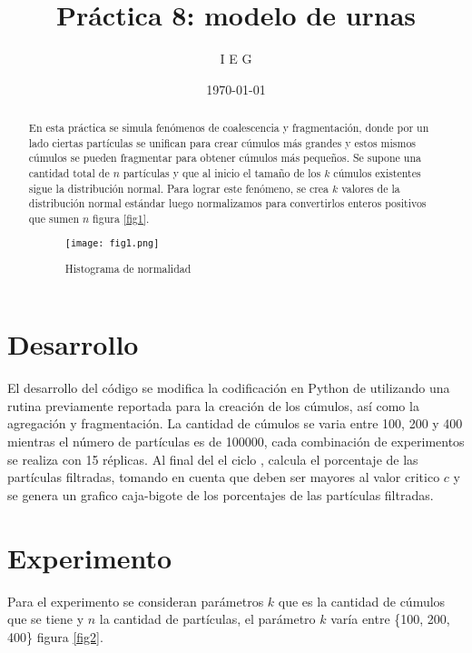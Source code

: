 \documentclass{article}
\author{I E G} %
\title{Práctica 8: modelo de urnas  } %
\date{\today}
\begin{document}

\maketitle %

\begin{abstract} %
En esta práctica \cite{elis8} se simula fenómenos de coalescencia y fragmentación, donde por un lado ciertas partículas se unifican para crear cúmulos más grandes y estos mismos cúmulos se pueden fragmentar para obtener cúmulos más pequeños.
Se supone una cantidad total de $n$ partículas y que al inicio el tamaño de los $k$ cúmulos existentes sigue la distribución normal. Para lograr este fenómeno, se crea $k$ valores de la distribución normal estándar luego normalizamos para convertirlos enteros positivos que sumen $n$ figura \ref{fig1}.

\begin{figure} [h!]%
    \centering
    \texttt{[image: fig1.png]} %
    \caption{Histograma de normalidad }
    \label{fig1}
\end{figure}

\end{abstract}


\section{Desarrollo}
El desarrollo del código se modifica la codificación en Python de \cite{elis8}\cite{denis2} utilizando una rutina previamente reportada para la creación de los cúmulos, así como la agregación y fragmentación.
La cantidad de cúmulos se varia entre 100, 200 y 400 mientras el número de partículas es de 100000, cada combinación de experimentos se realiza con 15 réplicas.
Al final del el ciclo \cite{cae}, calcula el porcentaje de las partículas filtradas, tomando en cuenta que deben ser mayores al valor critico $c$ y se genera un grafico caja-bigote de los porcentajes de las partículas filtradas. 



\section{Experimento}

Para el experimento \cite{Fab2} se consideran parámetros $k$ que es la cantidad de cúmulos que se tiene y $n$ la cantidad de partículas, el parámetro $k$ varía entre \{100, 200, 400\} figura \ref{fig2}.
\end{document}
